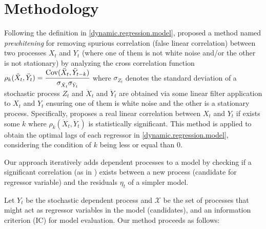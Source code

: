 \documentclass[a4paper]{easychair}
\begin{document}
\section{Methodology}

Following the definition in \ref{dynamic.regression.model}, \cite{cryer2008time} proposed a method named \textit{prewhitening} for removing spurious correlation (false linear correlation) between two processes $X_t$ and $Y_t$ (where one of them is not white noise and/or the other is not stationary) by analyzing the cross correlation function $\rho_k(\ddot{X}_t, \ddot{Y}_t) =  \cfrac{\text{Cov}(\ddot{X}_t, \ddot{Y}_{t-k})}{\sigma_{\ddot{X}_t} \sigma_{\ddot{Y}_t}} $ where $\sigma_{Z_t}$ denotes the standard deviation of a stochastic process $Z_t$ and $\ddot{X}_t$ and $\ddot{Y}_t$ are obtained via some linear filter application to $X_t$ and $Y_t$ ensuring one of them is white noise and the other is a stationary process. Specifically, \cite{cryer2008time} proposes a real linear correlation between $X_t$ and $Y_t$ if exists some $k$ where $\rho_k(\ddot{X}_t, \ddot{Y}_t)$ is statistically significant. This method is applied to obtain the optimal lags of each regressor in \ref{dynamic.regression.model}, considering the condition of $k$ being less or equal than $0$.

Our approach iteratively adds dependent processes to a model by checking if a significant correlation (as in \cite{cryer2008time}) exists between a new process (candidate for regressor variable) and the residuals $\eta_t$ of a simpler model.

Let $Y_t$ be the stochastic dependent process and $\mathcal{X}$ be the set of processes that might act as regressor variables in the model (candidates), and an information criterion (IC) for model evaluation. Our method proceeds as follows:
\end{document}
